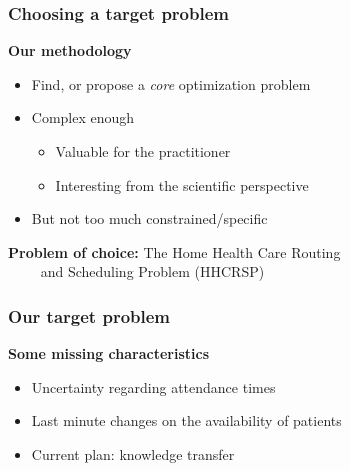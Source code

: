 \begin{frame}
   \frametitle{Choosing a target problem}

   \textbf{Our methodology}
   \begin{itemize}
      \item Find, or propose a \textit{core} optimization problem
      \item Complex enough
      \begin{itemize}
         \item Valuable for the practitioner
         \item Interesting from the scientific perspective
      \end{itemize}
      \item But not too much constrained/specific
   \end{itemize}

   \vspace*{18pt}
  \pause


   \textbf{Problem of choice: } The Home Health Care Routing \\
   \qquad \qquad \qquad \qquad ~~~~ and Scheduling Problem (HHCRSP)



\end{frame}

\begin{frame}
   \frametitle{Our target problem}

   \textbf{Some missing characteristics}
   \begin{itemize}
      \item Uncertainty regarding attendance times
      \item Last minute changes on the availability of patients
      \item Current plan: knowledge transfer
   \end{itemize}
\end{frame}

